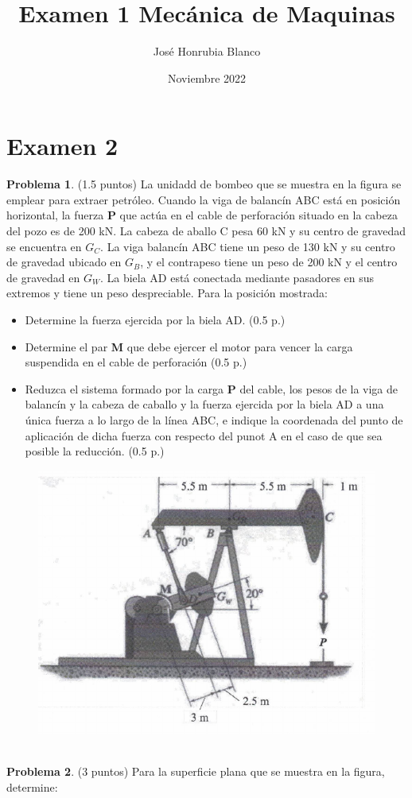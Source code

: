 \documentclass[10pt]{article}
\title{Examen 1 Mecánica de Maquinas}
\author{José Honrubia Blanco }
\date{Noviembre 2022}
\begin{document}
\section{Examen 2}
\textbf{Problema 1}. (1.5 puntos) La unidadd de bombeo que se muestra en la figura se emplear para extraer petróleo. Cuando la viga de balancín ABC está en posición horizontal, la fuerza \textbf{P} que actúa en el cable de perforación situado en la cabeza del pozo es de 200 kN. La cabeza de aballo C pesa 60 kN y su centro de gravedad se encuentra en $G _{C}$. La viga balancín ABC tiene un peso de 130 kN y su centro de gravedad ubicado en $G _{B}$, y el contrapeso tiene un peso de 200 kN y el centro de gravedad en $G _{W}$. La biela AD está conectada mediante pasadores en sus extremos y tiene un peso despreciable. Para la posición mostrada:
\begin{itemize}
    \item Determine la fuerza ejercida por la biela AD. (0.5 p.)
    \item Determine el par \textbf{M} que debe ejercer el motor para vencer la carga suspendida en el cable de perforación (0.5 p.)
    \item Reduzca el sistema formado por la carga \textbf{P} del cable, los pesos de la viga de balancín y la cabeza de caballo y la fuerza ejercida por la biela AD a una única fuerza a lo largo de la línea ABC, e indique la coordenada del punto de aplicación de dicha fuerza con respecto del punot A en el caso de que sea posible la reducción. (0.5 p.)
\end{itemize}
\begin{figure}[h!]
    \centering
    \includegraphics[width=0.45\linewidth]{problema_1.pdf}
    \label{fig:}
  \end{figure}
\\ 
\textbf{Problema 2}. (3 puntos) Para la superficie plana que se muestra en la figura, determine:
\end{document}
